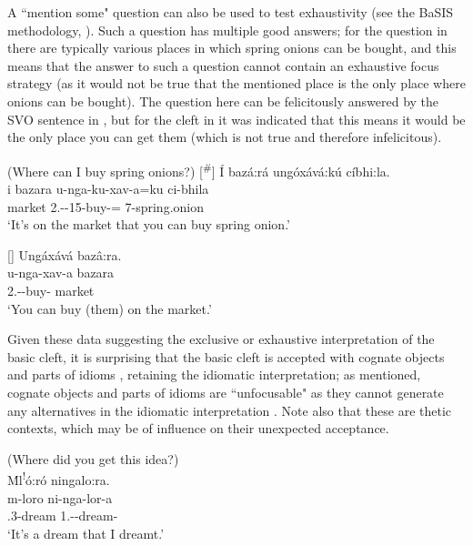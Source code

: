 \documentclass[output=paper]{langscibook}
\begin{document}
\z

A ``mention some" question can also be used to test exhaustivity (see the BaSIS methodology, \citealt{vanderWal2021a}). Such a question has multiple good answers; for the question in  there are typically various places in which spring onions can be bought, and this means that the answer to such a question cannot contain an exhaustive focus strategy (as it would not be true that the mentioned place is the only place where onions can be bought). The question here can be felicitously answered by the SVO sentence in , but for the cleft in  it was indicated that this means it would be the only place you can get them (which is not true and therefore infelicitous). 

\ea\label{bkm:Ref120694878}(Where can I buy spring onions?)
\ea
[\textsuperscript{\#}]{
\label{bkm:Ref120694878:a}
Í bazá:rá ungóxává:kú cíbhi:la.\\
\gll
i  bazara  u-nga-ku-xav-a=ku  ci-bhila\\
\COP{}  market  2\SG.\SM{}-\POT{}-15-buy-\FV{}=\REL{}  7-spring.onion\\
\glt
‘It’s on the market that you can buy spring onion.’\\
}


\ex
[]{
\label{bkm:Ref120694878:b}
Ungáxává bazâ:ra.\\
\gll
u-nga-xav-a  bazara\\
2\SG.\SM{}-\POT{}-buy-\FV{}  market\\
\glt
‘You can buy (them) on the market.’\\
}  

\z
\z

Given these data suggesting the exclusive or exhaustive interpretation of the basic cleft, it is surprising that the basic cleft is accepted with cognate objects  and parts of idioms , retaining the idiomatic interpretation; as mentioned, cognate objects and parts of idioms are ``unfocusable" as they cannot generate any alternatives in the idiomatic interpretation \citep[see][]{vanderWal2016,vanderWal2022}. Note also that these are thetic contexts, which may be of influence on their unexpected acceptance.

\ea
\label{bkm:Ref141364676}
(Where did you get this idea?)\\
\'{M}l\textsuperscript{!}ó:ró ningalo:ra.\\
\gll
m-loro  ni-nga-lor-a\\
\COP.3-dream  1\SG.\SM{}-\REL{}-dream-\FV{}\\
\glt
‘It’s a dream that I dreamt.’\\
\end{document}
